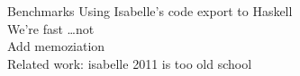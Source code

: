 \documentclass[%
	sans,
	12pt,
]{beamer}
\begin{document}
\begin{frame}{Benchmarks}
  Using Isabelle's code export to Haskell \\
  We're fast \dots not \\
  Add memoziation \\
  Related work: isabelle 2011 is too old school \\
\end{frame}
\end{document}
